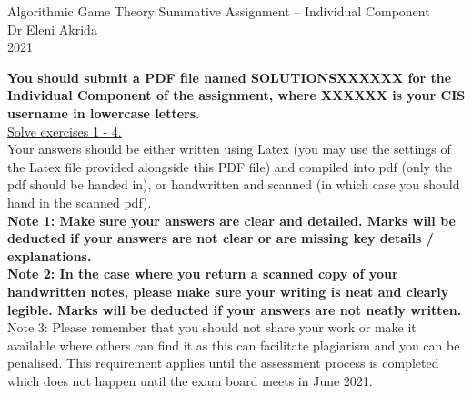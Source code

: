 \documentclass{article}
\begin{document}
\begin{center}
	\LARGE{Algorithmic Game Theory Summative Assignment -- Individual Component}\\[0.1cm]
	\Large{Dr Eleni Akrida}\\[0.1cm]
	2021\\[0.5cm]
\end{center}


\noindent \textbf{You should submit a PDF file named SOLUTIONSXXXXXX for the Individual Component of the assignment, where XXXXXX is your CIS username in lowercase letters.}\\[0.1cm]

\noindent\underline{Solve exercises 1 - 4.}\\
Your answers should be either written using Latex (you may use the settings of the Latex file provided alongside this PDF file) and compiled into pdf (only the pdf should be handed in), or handwritten and scanned (in which case you should hand in the scanned pdf).\\[0.1cm]
\textbf{Note 1: Make sure your answers are clear and detailed. Marks will be deducted if your answers are not clear or are missing key details / explanations.}\\
\textbf{Note 2: In the case where you return a scanned copy of your handwritten notes, please make sure your writing is neat and clearly legible. Marks will be deducted if your answers are not neatly written.}\\[0.1cm]
Note 3: Please remember that you should not share your work or make it available where others can find it as this can facilitate plagiarism and you can be penalised. This
requirement applies until the assessment process is completed which does not happen until the exam board meets in June 2021.\\[0.8cm]
\end{document}
